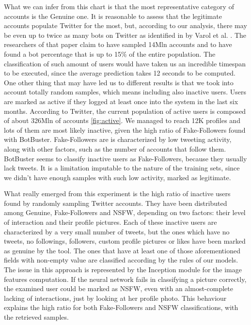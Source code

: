 What we can infer from this chart is that the most representative category of accounts is the Genuine one.
It is reasonable to assess that the legitimate accounts populate Twitter for the most, but, according to our analysis, there may be even up to twice as many bots on Twitter as identified in by Varol et al. \cite{Varol}. The researchers of that paper claim to have sampled 14Mln accounts and to have found a bot percentage that is up to 15\% of the entire population.
The classification of such amount of users would have taken us an incredible timespan to be executed, since the average prediction takes 12 seconds to be computed.
One other thing that may have led us to different results is that we took into account totally random samples, which means including also inactive users.
Users are marked as active if they logged at least once into the system in the last six months. According to Twitter, the current population of active users is composed of about 326Mln of accounts \ref{fig:active}. We managed to reach 12K profiles and lots of them are most likely inactive, given the high ratio of Fake-Followers found with BotBuster. Fake-Followers are is characterized by low tweeting activity, along with other factors, such as the number of accounts that follow them. BotBuster seems to classify inactive users as Fake-Followers, because they usually lack tweets. It is a limitation imputable to the nature of the training sets, since we didn't have enough samples with such low activity, marked as legitimate.

What really emerged from this experiment is the high ratio of inactive users found by randomly sampling Twitter accounts. They have been distributed among Genuine, Fake-Followers and NSFW, depending on two factors: their level of interaction and their profile pictures.
Each of these inactive users are characterized by a very small number of tweets, but the ones which have no tweets, no followings, followers, custom profile pictures or likes have been marked as genuine by the tool. The ones that have at least one of those aforementioned fields with non-empty value are classified according by the rules of our models. The issue in this approach is represented by the Inception module for the image features computation. If the neural network fails in classifying a picture correctly, the examined user could be marked as NSFW, even with an almost-complete lacking of interactions, just by looking at her profile photo. This behaviour explains the high ratio for both Fake-Followers and NSFW classifications, with the retrieved samples.

